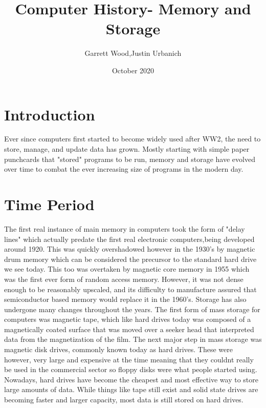 \documentclass{article}
\title{Computer History- Memory and Storage}
\author{Garrett Wood,Justin Urbanich }
\date{October 2020}
\begin{document}
\maketitle

\section{Introduction}
Ever since computers first started to become widely used after WW2, the need to store, manage, and update data has grown. Mostly starting with simple paper punchcards that "stored" programs to be run, memory and storage have evolved over time to combat the ever increasing size of programs in the modern day.
\section{Time Period}
The first real instance of main memory in computers took the form of "delay lines" which actually predate the first real electronic computers,being developed around 1920. This was quickly overshadowed however in the 1930's by magnetic drum memory which can be considered the precursor to the standard hard drive we see today. This too was overtaken by magnetic core memory in 1955 which was the first ever form of random access memory. However, it was not dense enough to be reasonably upscaled, and its difficulty to manufacture assured that semiconductor based memory would replace it in the 1960's. Storage has also undergone many changes throughout the years. 
The first form of mass storage for computers was magnetic tape, which like hard drives today was composed of a magnetically coated surface that was moved over a seeker head that interpreted data from the magnetization of the film. The next major step in mass storage was magnetic disk drives, commonly known today as hard drives. These were however, very large and expensive at the time meaning that they couldnt really be used in the commercial sector so floppy disks were what people started using. Nowadays, hard drives have become the cheapest and most effective way to store large amounts of data. While things like tape still exist and solid state drives are becoming faster and larger capacity, most data is still stored on hard drives.
\end{document}
